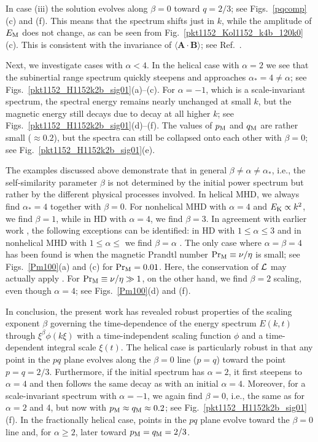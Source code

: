 \documentclass[prl,twocolumn,aps,psfig,showpacs,nofootinbib,nobibnotes,superscriptaddress,preprintnumbers,times]{revtex4}
\newcommand{\BB}{\bm{B}}
\newcommand{\AAA}{\bm{A}}
\newcommand{\bra}[1]{\langle #1\rangle}
\newcommand{\Figp}[2]{Fig.~\ref{#1}({#2})}
\newcommand{\Figsp}[3]{Figs.~\ref{#1}({#2}) and ({#3})}
\newcommand{\Figssp}[3]{Figs.~\ref{#1}({#2})--({#3})}
\def\EM{E_{\rm M}}
\def\Pm{\mbox{\rm Pr}_{\rm M}}
\def\pM{p_{\rm M}}
\def\qM{q_{\rm M}}
\begin{document}
In case (iii) the solution evolves along $\beta=0$
toward $q=2/3$; see \Figsp{pqcomp}{c}{f}.
This means that the spectrum shifts just in $k$, while the
amplitude of $\EM$ does not change, as can be seen from
\Figp{pkt1152_Kol1152_k4b_120k0}{c}.
This is consistent with the invariance of $\bra{\AAA\cdot\BB}$;
see Ref.~\cite{BM99}.

Next, we investigate cases with $\alpha<4$.
In the helical case with $\alpha=2$ we see that the
subinertial range spectrum quickly steepens and approaches
$\alpha_\ast=4\neq\alpha$; see \Figssp{pkt1152_H1152k2b_sig01}{a}{c}.
For $\alpha=-1$, which is a scale-invariant spectrum, the
spectral energy remains nearly unchanged at small $k$, but the
magnetic energy still decays due to decay at all higher $k$; see
\Figssp{pkt1152_H1152k2b_sig01}{d}{f}.
The values of $\pM$ and $\qM$ are rather small ($\approx0.2$), but
the spectra can still be collapsed onto each other with $\beta=0$;
see \Figp{pkt1152_H1152k2b_sig01}{e}.

The examples discussed above demonstrate that in general
$\beta\neq\alpha\neq\alpha_\ast$,
i.e., the self-similarity parameter $\beta$ is not determined by the initial
power spectrum but rather by the different physical processes involved.
In helical MHD, we always find $\alpha_\ast=4$ together with $\beta=0$.
For nonhelical MHD with $\alpha=4$ and $E_{\rm K}\propto k^2$,
we find $\beta=1$, while in HD with $\alpha=4$, we find $\beta=3$.
In agreement with earlier work \cite{YHB04}, the following exceptions
can be identified: in HD with $1\leq\alpha\leq3$
and in nonhelical MHD with $1\leq\alpha\leq$ we find $\beta=\alpha$
\cite{suppl}.
The only case where $\alpha=\beta=4$ has been found is when the magnetic
Prandtl number $\Pm\equiv\nu/\eta$ is small; see \Figsp{Pm100}{a}{c} for $\Pm=0.01$.
Here, the conservation of ${\cal L}$ may actually apply \cite{Dav10}.
For $\Pm\equiv\nu/\eta\gg1$, on the other hand, we find $\beta=2$ scaling, even
though $\alpha=4$; see \Figsp{Pm100}{d}{f}.

In conclusion, the present work has revealed robust properties
of the scaling exponent $\beta$ governing the time-dependence
of the energy spectrum $E(k,t)$ through $\xi^\beta\phi(k\xi)$
with a time-independent scaling function $\phi$ and a time-dependent
integral scale $\xi(t)$.
The helical case is particularly robust in that any point in the $pq$
plane evolves along the $\beta=0$ line ($p=q$) toward the point $p=q=2/3$.
Furthermore, if the initial spectrum has $\alpha=2$, it first steepens to
$\alpha=4$ and then follows the same decay as with an initial $\alpha=4$.
Moreover, for a scale-invariant spectrum with $\alpha=-1$, we again find
$\beta=0$, i.e., the same as for $\alpha=2$ and 4, but now with
$\pM\approx\qM\approx0.2$; see \Figp{pkt1152_H1152k2b_sig01}{f}.
In the fractionally helical case, points in the $pq$ plane
evolve toward the $\beta=0$ line and, for $\alpha\ge2$,
later toward $\pM=\qM=2/3$.
\end{document}
